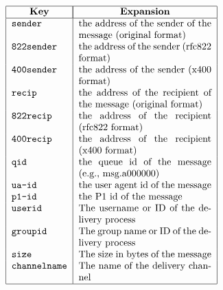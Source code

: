 \[\begin{tabular} {|l|p{0.4\textwidth}|}
\hline
	\multicolumn{1}{|c|}{\bf Key} & 
		\multicolumn{1}{|c|}{\bf Expansion} \\
\hline
	\tt sender & 
		the address of the sender of the message (original format) \\
	\tt 822sender & 
		the address of the sender (rfc822 format) \\
	\tt 400sender & 
		the address of the sender (x400 format) \\
	\tt recip & 
		the address of the recipient of the message (original format) \\ 
	\tt 822recip & 
		the address of the recipient (rfc822 format) \\
	\tt 400recip & 
		the address of the recipient (x400 format) \\
	\tt qid & 
		the queue id of the message (e.g., msg.a000000) \\
	\tt ua-id & 
		the user agent id of the message \\
	\tt p1-id & 
		the P1 id of the message \\
	\tt userid & The username or ID of the delivery process\\
	\tt groupid & The group name or ID of the delivery process \\
	\tt size & The size in bytes of the message \\
	\tt channelname & The name of the delivery channel \\
\hline
\end{tabular}\]
